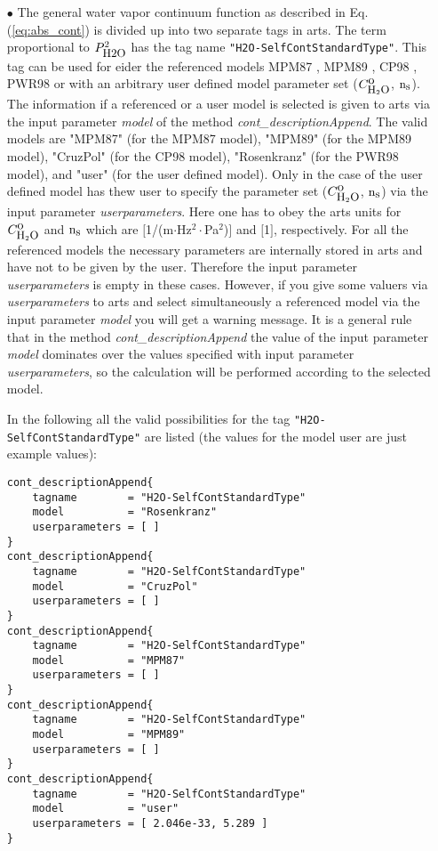 {\begin{itemize}
\item[$\bullet$] The general water vapor continuum function
as described in Eq. (\ref{eq:abs_cont}) is divided up into 
two separate tags in arts. The term proportional 
to $P_{\mbox{\rm \small H2O}}^2$ has the tag name {\tt "H2O-SelfContStandardType"}. 
This tag can be used for eider the referenced models 
MPM87 \citep{liebeandlayton:87}, MPM89 \citep{liebe:89}, 
CP98 \citep{cruzpol:98}, PWR98 \citep{pwr:98} or with
an arbitrary user defined model parameter set ($C^{\mbox{\rm o}}_{\mbox{\rm \small H}_{2}\mbox{\rm \small O}}$, ${\rm n}_{\mbox{\rm \small s}}$).
The information if a referenced or a user model is selected 
is given to arts via the input parameter {\it model} of the 
method {\it cont\_descriptionAppend}. The valid models are
"MPM87" (for the MPM87 model), "MPM89" (for the MPM89 model), 
"CruzPol" (for the CP98 model), "Rosenkranz" (for the PWR98 model), 
and "user"  (for the user defined model). Only in the case 
of the user defined model has thew user to specify the 
parameter set ($C^{\mbox{\rm o}}_{\mbox{\rm \small H}_{2}\mbox{\rm \small O}}$, ${\rm n}_{\mbox{\rm \small s}}$) via the input parameter 
{\it userparameters}. Here one has to obey the arts units for 
$C^{\mbox{\rm o}}_{\mbox{\rm \small H}_{2}\mbox{\rm \small O}}$ and ${\rm n}_{\mbox{\rm \small s}}$ which are $[$1/(m$\cdot$Hz$^2\cdot$Pa$^2$)$]$ and 
$[$1$]$, respectively. For all the referenced models the necessary
parameters are internally stored in arts and have not to be given by
the user. Therefore the input parameter {\it userparameters} is empty
in these cases. However, if you give some valuers via 
{\it userparameters} to arts and select simultaneously a 
referenced model via the input parameter {\it model} you will get 
a warning message. It is a general rule that in the method 
{\it cont\_descriptionAppend} the value of the input 
parameter {\it model} dominates over the values specified with 
input parameter {\it userparameters}, so the calculation will be
performed according to the selected model.

In the following all the valid possibilities for the
tag {\tt "H2O-SelfContStandardType"} are listed (the values for the 
model user are just example values): 
\begin{verbatim}
cont_descriptionAppend{
    tagname        = "H2O-SelfContStandardType"
    model          = "Rosenkranz"
    userparameters = [ ]
}
cont_descriptionAppend{
    tagname        = "H2O-SelfContStandardType"
    model          = "CruzPol"
    userparameters = [ ]
}
cont_descriptionAppend{
    tagname        = "H2O-SelfContStandardType"
    model          = "MPM87"
    userparameters = [ ]
}
cont_descriptionAppend{
    tagname        = "H2O-SelfContStandardType"
    model          = "MPM89"
    userparameters = [ ]
}
cont_descriptionAppend{
    tagname        = "H2O-SelfContStandardType"
    model          = "user"
    userparameters = [ 2.046e-33, 5.289 ]
}
\end{verbatim}



\end{itemize}}
